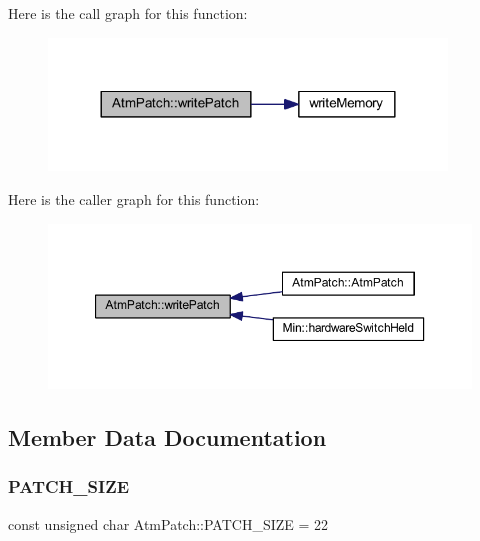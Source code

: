 Here is the call graph for this function\+:
\nopagebreak
\begin{figure}[H]
\begin{center}
\leavevmode
\includegraphics[width=300pt]{d9/de1/class_atm_patch_a5814cd528970cb153dd67865a6b86c85_cgraph}
\end{center}
\end{figure}
Here is the caller graph for this function\+:
\nopagebreak
\begin{figure}[H]
\begin{center}
\leavevmode
\includegraphics[width=350pt]{d9/de1/class_atm_patch_a5814cd528970cb153dd67865a6b86c85_icgraph}
\end{center}
\end{figure}


\subsection{Member Data Documentation}
\mbox{\label{class_atm_patch_a1ae078abd4f165fa8b0eb14d0acd48c0}} 
\subsubsection{\texorpdfstring{P\+A\+T\+C\+H\+\_\+\+S\+I\+ZE}{PATCH\_SIZE}}
{\footnotesize\ttfamily const unsigned char Atm\+Patch\+::\+P\+A\+T\+C\+H\+\_\+\+S\+I\+ZE = 22\hspace{0.3cm}{\ttfamily [static]}}



